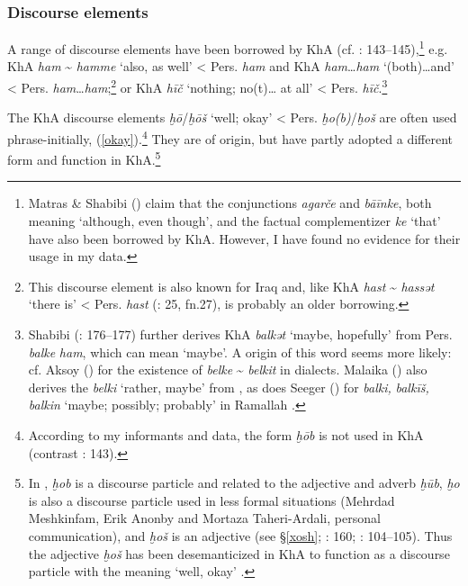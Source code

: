 \documentclass[output=paper,nonflat]{langsci/langscibook}
\begin{document}

\subsubsection{Discourse elements}

A range of  discourse elements have been borrowed by KhA (cf. \citealt{MatrasShabibi2007}: 143–145),\footnote{Matras \& Shabibi (\citeyear[144]{MatrasShabibi2007}) claim that the  conjunctions \textit{agarče} and \textit{bāīnke}, both meaning ‘although, even though’, and the  factual {complementizer} \textit{ke} ‘that’ have also been borrowed by KhA. However, I have found no evidence for their usage in my data.} e.g. KhA \textit{ham} \~{} \textit{hamme} ‘also, as well’ < Pers. \textit{ham} and KhA \textit{ham}…\textit{ham} ‘(both)…and’ < Pers. \textit{ham}…\textit{ham};\footnote{This discourse element is also known for Iraq \citep[36]{Malaika1963} and, like KhA \textit{hast} \~{} \textit{hassət} ‘there is’ < Pers. \textit{hast} (\citealt{Ingham1973}: 25, fn.27), is probably an older borrowing.} or KhA \textit{hīč} ‘nothing; no(t)… at all’ < Pers. \textit{hīč}.\footnote{Shabibi (\citeyear{Shabibi2006}: 176–177) further derives KhA \textit{balkət} ‘maybe, hopefully’ from Pers. \textit{balke} \textit{ham}, which can mean ‘maybe’. A  origin of this word seems more likely: cf. Aksoy (\citeyear[620]{Aksoy1963}) for the existence of \textit{belke} \~{} \textit{belkit} in   dialects. Malaika (\citeyear[35]{Malaika1963}) also derives the   \textit{belki} ‘rather, maybe’ from , as does Seeger (\citeyear[28]{Seeger2009}) for \textit{balki,} \textit{balkīš,} \textit{balkin} ‘maybe; possibly; probably’ in Ramallah .} 

The KhA discourse elements \textit{ḫō}/\textit{ḫōš} ‘well; okay’ < Pers. \textit{ḫo(b)}/\textit{ḫoš} are often used phrase-initially, (\ref{okay}).\footnote{According to my informants and data, the form \textit{ḫōb} is not used in KhA (contrast \citealt{MatrasShabibi2007}: 143).} They are of  origin, but have partly adopted a different form and function in KhA.\footnote{In , \textit{ḫob} is a discourse particle and related to the adjective and adverb \textit{ḫūb}, \textit{ḫo} is also a discourse particle used in less formal situations (Mehrdad Meshkinfam, Erik Anonby and Mortaza Taheri-Ardali, personal communication), and \textit{ḫoš} is an adjective (see §\ref{xosh}; \citealt{Shabibi2006}: 160; \citealt{Mohammadi2018}: 104--105). Thus the  adjective \textit{ḫoš} has been desemanticized in KhA to function as a discourse particle with the meaning ‘well, okay’ \citep[160]{Shabibi2006}.}
\end{document}
